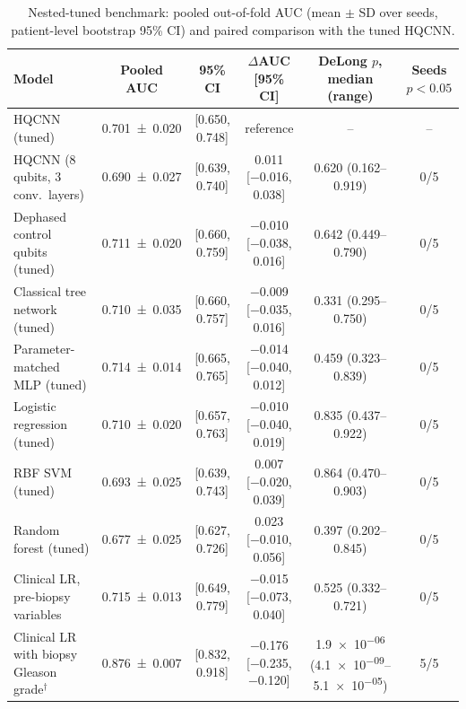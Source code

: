 \begin{table}[tbp]
\centering
\caption{Nested-tuned benchmark: pooled out-of-fold AUC (mean $\pm$ SD over seeds, patient-level bootstrap 95\% CI) and paired comparison with the tuned HQCNN.}
\label{tab:s_p3_comparisons}
\scriptsize\setlength{\tabcolsep}{3pt}
\begin{tabular}{>{\raggedright\arraybackslash}p{3.6cm}ccccc}
\toprule
Model & Pooled AUC & 95\% CI & $\Delta$AUC [95\% CI] & DeLong $p$, median (range) & Seeds $p<0.05$ \\
\midrule
HQCNN (tuned) & \num{0.701 \pm 0.020} & [\num{0.650}, \num{0.748}] & reference & -- & -- \\
HQCNN (8 qubits, 3 conv.\ layers) & \num{0.690 \pm 0.027} & [\num{0.639}, \num{0.740}] & \num{+0.011} [\num{-0.016}, \num{+0.038}] & \num{0.620} (\num{0.162}--\num{0.919}) & \num{0}/\num{5} \\
Dephased control qubits (tuned) & \num{0.711 \pm 0.020} & [\num{0.660}, \num{0.759}] & \num{-0.010} [\num{-0.038}, \num{+0.016}] & \num{0.642} (\num{0.449}--\num{0.790}) & \num{0}/\num{5} \\
Classical tree network (tuned) & \num{0.710 \pm 0.035} & [\num{0.660}, \num{0.757}] & \num{-0.009} [\num{-0.035}, \num{+0.016}] & \num{0.331} (\num{0.295}--\num{0.750}) & \num{0}/\num{5} \\
Parameter-matched MLP (tuned) & \num{0.714 \pm 0.014} & [\num{0.665}, \num{0.765}] & \num{-0.014} [\num{-0.040}, \num{+0.012}] & \num{0.459} (\num{0.323}--\num{0.839}) & \num{0}/\num{5} \\
Logistic regression (tuned) & \num{0.710 \pm 0.020} & [\num{0.657}, \num{0.763}] & \num{-0.010} [\num{-0.040}, \num{+0.019}] & \num{0.835} (\num{0.437}--\num{0.922}) & \num{0}/\num{5} \\
RBF SVM (tuned) & \num{0.693 \pm 0.025} & [\num{0.639}, \num{0.743}] & \num{+0.007} [\num{-0.020}, \num{+0.039}] & \num{0.864} (\num{0.470}--\num{0.903}) & \num{0}/\num{5} \\
Random forest (tuned) & \num{0.677 \pm 0.025} & [\num{0.627}, \num{0.726}] & \num{+0.023} [\num{-0.010}, \num{+0.056}] & \num{0.397} (\num{0.202}--\num{0.845}) & \num{0}/\num{5} \\
Clinical LR, pre-biopsy variables & \num{0.715 \pm 0.013} & [\num{0.649}, \num{0.779}] & \num{-0.015} [\num{-0.073}, \num{+0.040}] & \num{0.525} (\num{0.332}--\num{0.721}) & \num{0}/\num{5} \\
Clinical LR with biopsy Gleason grade$^{\dagger}$ & \num{0.876 \pm 0.007} & [\num{0.832}, \num{0.918}] & \num{-0.176} [\num{-0.235}, \num{-0.120}] & \num{1.9e-06} (\num{4.1e-09}--\num{5.1e-05}) & \num{5}/\num{5} \\
\bottomrule
\end{tabular}
\par{}
\end{table}
